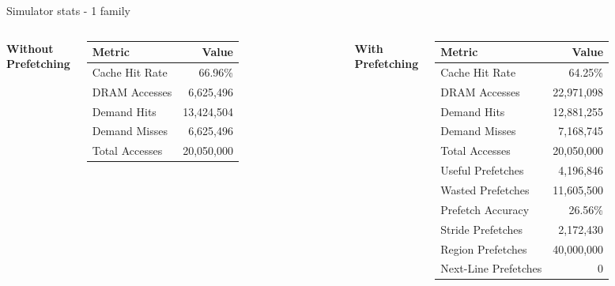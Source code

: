 \documentclass[Serif, 10pt, brown]{beamer}
\theoremstyle{example}
\theoremstyle{plain}
\begin{document}
\begin{frame}{Simulator stats - 1 family}

\begin{columns}
    \centering
    \textbf{Without Prefetching}
    
    \vspace{2mm}
    
    {\scriptsize \begin{tabular}{|l|r|}
        \hline
        Metric & Value \\
        \hline
        Cache Hit Rate & 66.96\% \\
        DRAM Accesses & 6,625,496 \\
        Demand Hits & 13,424,504 \\
        Demand Misses & 6,625,496 \\
        Total Accesses & 20,050,000 \\
        \hline
    \end{tabular}}

    \centering
    \textbf{With Prefetching}
    
    \vspace{2mm}
    
    {\scriptsize \begin{tabular}{|l|r|}
        \hline
        Metric & Value \\
        \hline
        Cache Hit Rate & 64.25\% \\
        DRAM Accesses & 22,971,098 \\
        Demand Hits & 12,881,255 \\
        Demand Misses & 7,168,745 \\
        Total Accesses & 20,050,000 \\
        Useful Prefetches & 4,196,846 \\
        Wasted Prefetches & 11,605,500 \\
        Prefetch Accuracy & 26.56\% \\
        Stride Prefetches & 2,172,430 \\
        Region Prefetches & 40,000,000 \\
        Next-Line Prefetches & 0 \\
        \hline
    \end{tabular}}

\end{columns}

\vspace{3mm}

\centering
\small

\end{frame}
\end{document}
